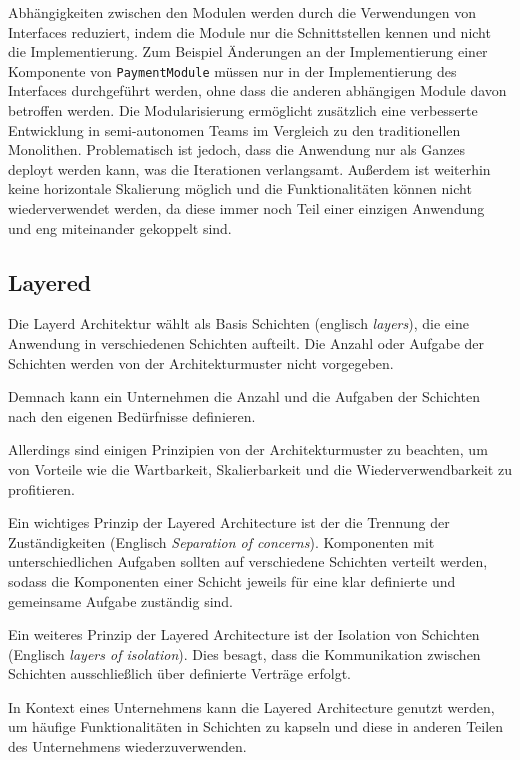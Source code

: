 \documentclass[acmtog]{acmart}
\begin{document}
Abhängigkeiten zwischen den Modulen werden durch die Verwendungen von Interfaces
reduziert, indem die Module nur die Schnittstellen kennen und nicht die Implementierung.
Zum Beispiel Änderungen an der Implementierung einer Komponente von \texttt{PaymentModule} müssen nur
in der Implementierung des Interfaces durchgeführt werden, ohne dass die anderen
abhängigen Module davon betroffen werden.
Die Modularisierung ermöglicht zusätzlich eine verbesserte Entwicklung in semi-autonomen Teams im
Vergleich zu den traditionellen Monolithen.
Problematisch ist jedoch, dass die Anwendung nur als Ganzes deployt werden kann, was
die Iterationen verlangsamt.
Außerdem ist weiterhin keine horizontale Skalierung möglich und die Funktionalitäten
können nicht wiederverwendet werden, da diese immer noch Teil einer einzigen Anwendung
und eng miteinander gekoppelt sind.

\subsection{Layered}
Die Layerd Architektur wählt als Basis Schichten (englisch \textit{layers}), die eine
Anwendung in verschiedenen Schichten aufteilt.
Die Anzahl oder Aufgabe der Schichten werden von der Architekturmuster nicht vorgegeben. ~\cite [34]{layered2}

Demnach kann ein Unternehmen die Anzahl und die Aufgaben der Schichten nach den eigenen
Bedürfnisse definieren.

Allerdings sind einigen Prinzipien von der Architekturmuster zu beachten, um von Vorteile
wie die Wartbarkeit, Skalierbarkeit und die Wiederverwendbarkeit zu profitieren.~\cite [34]{layered2}

Ein wichtiges Prinzip der Layered Architecture ist der die Trennung der Zuständigkeiten
(Englisch \textit{Separation of concerns}). Komponenten mit unterschiedlichen Aufgaben sollten
auf verschiedene Schichten verteilt werden, sodass die Komponenten einer Schicht jeweils für
eine klar definierte und gemeinsame Aufgabe zuständig sind. \cite[34]{layered2}

Ein weiteres Prinzip der Layered Architecture ist der Isolation von Schichten (Englisch \textit{layers of isolation}).
Dies besagt, dass die Kommunikation zwischen Schichten ausschließlich über definierte Verträge erfolgt.
\cite[3 - 4]{layered}

In Kontext eines Unternehmens kann die Layered Architecture genutzt werden, um häufige
 Funktionalitäten in Schichten zu kapseln und diese in anderen Teilen des Unternehmens wiederzuverwenden.
\end{document}

